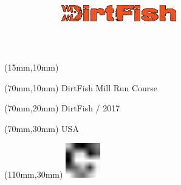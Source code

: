 \null\newpage
\begin{textblock*}{50mm}(15mm,10mm)%
\includegraphics[width=50mm]{LG/DIR.png}
\end{textblock*}
\begin{textblock*}{130mm}(70mm,10mm)%
{\fontsize{20}{20}\selectfont DirtFish Mill Run Course}\\
\end{textblock*}
\begin{textblock*}{120mm}(70mm,20mm)%
{\fontsize{16}{16}\selectfont DirtFish / 2017}\\
\end{textblock*}
\begin{textblock*}{120mm}(70mm,30mm)%
{\fontsize{12}{12}\selectfont USA}
\end{textblock*}
\begin{textblock*}{30mm}(110mm,30mm)%
\centering
\includegraphics[height=15mm]{icons/fa-rotate-right.pdf}
\end{textblock*}
